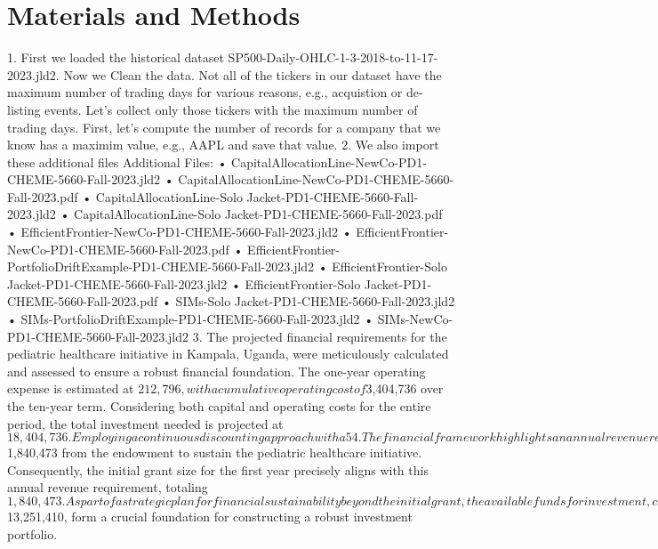 \documentclass[10pt,twocolumn,twoside,final]{IEEEtran}
\begin{document}
{{\section{Materials and Methods}
1.	First we loaded the historical dataset SP500-Daily-OHLC-1-3-2018-to-11-17-2023.jld2. Now we Clean the data. Not all of the tickers in our dataset have the maximum number of trading days for various reasons, e.g., acquistion or de-listing events. Let's collect only those tickers with the maximum number of trading days. First, let's compute the number of records for a company that we know has a maximim value, e.g., AAPL and save that value.
2.	We also import these additional files Additional Files:
•	CapitalAllocationLine-NewCo-PD1-CHEME-5660-Fall-2023.jld2
•	CapitalAllocationLine-NewCo-PD1-CHEME-5660-Fall-2023.pdf
•	CapitalAllocationLine-Solo Jacket-PD1-CHEME-5660-Fall-2023.jld2
•	CapitalAllocationLine-Solo Jacket-PD1-CHEME-5660-Fall-2023.pdf
•	EfficientFrontier-NewCo-PD1-CHEME-5660-Fall-2023.jld2
•	EfficientFrontier-NewCo-PD1-CHEME-5660-Fall-2023.pdf
•	EfficientFrontier-PortfolioDriftExample-PD1-CHEME-5660-Fall-2023.jld2
•	EfficientFrontier-Solo Jacket-PD1-CHEME-5660-Fall-2023.jld2
•	EfficientFrontier-Solo Jacket-PD1-CHEME-5660-Fall-2023.pdf
•	SIMs-Solo Jacket-PD1-CHEME-5660-Fall-2023.jld2
•	SIMs-PortfolioDriftExample-PD1-CHEME-5660-Fall-2023.jld2
•	SIMs-NewCo-PD1-CHEME-5660-Fall-2023.jld2
3.	The projected financial requirements for the pediatric healthcare initiative in Kampala, Uganda, were meticulously calculated and assessed to ensure a robust financial foundation. The one-year operating expense is estimated at $212,796, with a cumulative operating cost of $3,404,736 over the ten-year term. Considering both capital and operating costs for the entire period, the total investment needed is projected at $18,404,736. Employing a continuous discounting approach with a 5%
4.	The financial framework highlights an annual revenue requirement of $1,840,473 from the endowment to sustain the pediatric healthcare initiative. Consequently, the initial grant size for the first year precisely aligns with this annual revenue requirement, totaling $1,840,473. As part of a strategic plan for financial sustainability beyond the initial grant, the available funds for investment, calculated at $13,251,410, form a crucial foundation for constructing a robust investment portfolio.
}}
\end{document}
